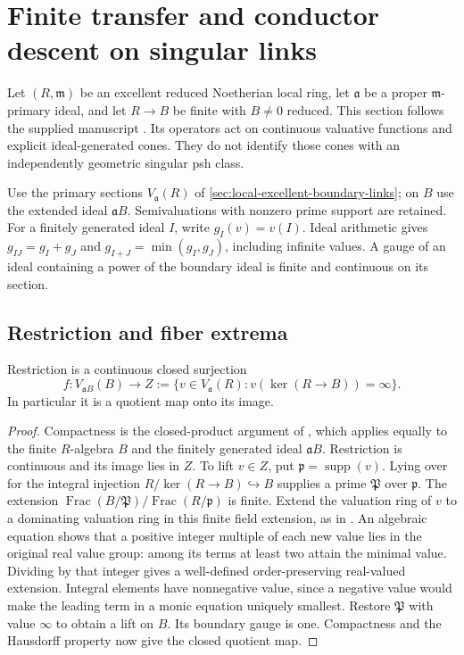 \section{Finite transfer and conductor descent on singular links}
\label{sec:supplied-p126}

Let $(R,\mathfrak m)$ be an excellent reduced Noetherian local ring,
let $\mathfrak a$ be a proper $\mathfrak m$-primary ideal, and let
$R\to B$ be finite with $B\ne0$ reduced. This section follows the supplied
manuscript \cite{SuppliedP12620260924}. Its operators act on continuous
valuative functions and explicit ideal-generated cones. They do not
identify those cones with an independently geometric singular psh class.

Use the primary sections $V_{\mathfrak a}(R)$ of
\cref{sec:local-excellent-boundary-links}; on $B$ use the extended ideal
$\mathfrak aB$. Semivaluations with nonzero prime support are retained.
For a finitely generated ideal $I$, write $g_I(v)=v(I)$. Ideal arithmetic
 gives $g_{IJ}=g_I+g_J$ and $g_{I+J}=\min(g_I,g_J)$, including infinite
values. A gauge of an ideal containing a power of the boundary ideal is
finite and continuous on its section.

\subsection{Restriction and fiber extrema}

\begin{lemma}\label{lem:supplied-p126-finite-restriction}
Restriction is a continuous closed surjection
\[
 f:V_{\mathfrak aB}(B)\longrightarrow
 Z:=\{v\in V_{\mathfrak a}(R):v(\ker(R\to B))=\infty\}.
\]
In particular it is a quotient map onto its image.
\end{lemma}

\begin{proof}
Compactness is the closed-product argument of
, which applies equally to the
finite $R$-algebra $B$ and the finitely generated ideal $\mathfrak aB$.
Restriction is continuous and its image lies in $Z$. To lift $v\in Z$,
put $\mathfrak p=\operatorname{supp}(v)$. Lying over for the integral
injection $R/\ker(R\to B)\hookrightarrow B$ supplies a prime
$\mathfrak P$ over $\mathfrak p$. The extension
$\operatorname{Frac}(B/\mathfrak P)/\operatorname{Frac}(R/\mathfrak p)$
is finite. Extend the valuation ring of $v$ to a dominating valuation
ring in this finite field extension, as in
.
An algebraic equation shows that a positive integer multiple of each
new value lies in the original real value group: among its terms at
least two attain the minimal value. Dividing by that integer gives a
well-defined order-preserving real-valued extension. Integral elements
have nonnegative value, since a negative value would make the leading
term in a monic equation uniquely smallest. Restore $\mathfrak P$ with
value $\infty$ to obtain a lift on $B$. Its boundary gauge is one.
Compactness and the Hausdorff property now give the closed quotient map.
\end{proof}

